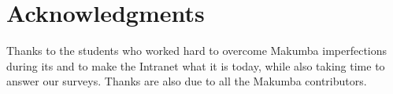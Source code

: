 \documentclass{chi2009}
\begin{document}
\section{Acknowledgments}\label{sec:acknowledgments}
Thanks to the students who worked hard to overcome Makumba imperfections during its  and to make the Intranet what it is today, while also taking time to answer our surveys.  Thanks are also due to all the Makumba contributors. 




\end{document}
